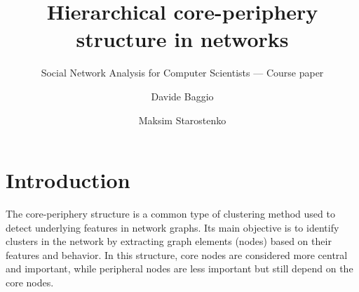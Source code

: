 \documentclass[sigconf]{acmart}
\begin{document}
\title{Hierarchical core-periphery structure in networks}
\subtitle{ Social Network Analysis for Computer Scientists --- Course paper} %

\author{Davide Baggio}

\author{Maksim Starostenko}

\renewcommand{\shortauthors}{Baggio and Starostenko}


\begin{abstract}


\end{abstract}

\maketitle

\section{Introduction}



The core-periphery structure is a common type of clustering method used to detect underlying features in network graphs. Its main objective is to identify clusters in the network by extracting graph elements (nodes) based on their features and behavior. In this structure, core nodes are considered more central and important, while peripheral nodes are less important but still depend on the core nodes.
\end{document}
